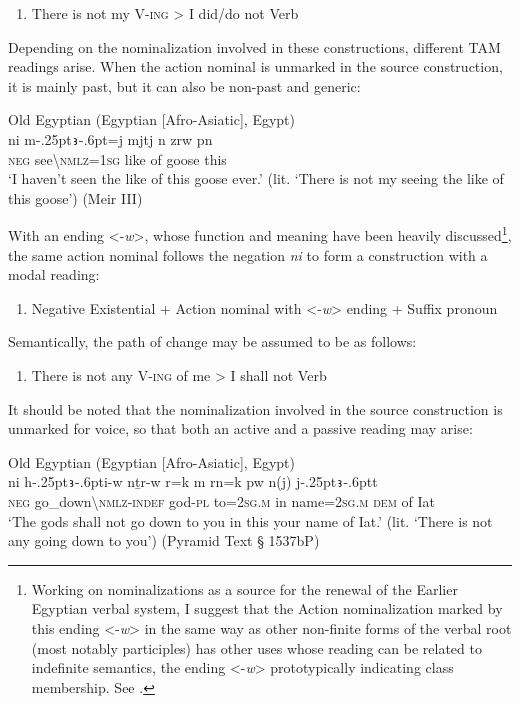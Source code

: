 \documentclass[output=paper]{langsci/langscibook}
\newcommand{\ꜥ}{ʿ}
\newcommand{\ꜣ}{\kern-.25pt\texttt{ꜣ}\kern-.6pt}
\begin{document}
\begin{enumerate}[label=(\roman*), resume] %
	\item There is not my V-\textsc{ing} > I did/do not Verb
\end{enumerate}

Depending on the nominalization involved in these constructions, different TAM readings arise. When the action nominal is unmarked in the source construction, it is mainly past, but it can also be non-past and generic: 

\ea Old Egyptian (Egyptian [Afro-Asiatic], Egypt) \label{ex:AE6}\\
	\gll ni m{\ꜣ}=j mjtj n zrw pn\\
	\textsc{neg} see\textbackslash\textsc{nmlz=1sg} like of goose this\\
	\glt ‘I haven’t seen the like of this goose ever.’ (lit. ‘There is not my seeing the like of this goose’) (Meir III)
\z 

With an ending <-\textit{w}>, whose function and meaning have been heavily discussed\footnote{Working on nominalizations as a source for the renewal of the Earlier Egyptian verbal system, I suggest that the Action nominalization marked by this ending <-\textit{w}> in the same way as other non-finite forms of the verbal root (most notably participles) has other uses whose reading can be related to indefinite semantics, the ending <-\textit{w}> prototypically indicating class membership. See \citet{Oreal2017}.}, the same action nominal follows the negation \textit{ni} to form a construction with a modal reading:

\begin{enumerate}[label=(\roman*), resume] %
	\item Negative Existential + Action nominal with <-\textit{w}> ending + Suffix pronoun
\end{enumerate}

Semantically, the path of change may be assumed to be as follows: 

\begin{enumerate}[label=(\roman*), resume] %
	\item There is not any V-\textsc{ing} of me > I shall not Verb
\end{enumerate}

It should be noted that the nominalization involved in the source construction is unmarked for voice, so that both an active and a passive reading may arise:

\ea Old Egyptian (Egyptian [Afro-Asiatic], Egypt) \label{ex:AE9}\\
	\gll ni h{\ꜣ}i-w nṯr-w r=k m rn=k pw n(j) j{\ꜣ}t\\
	\textsc{neg} go\_down\textbackslash\textsc{nmlz-indef} god-\textsc{pl} to=\textsc{2sg.m} in name=\textsc{2sg.m} \textsc{dem} of Iat\\
		‘The gods shall not go down to you in this your name of Iat.’ (lit. ‘There is not any going down to you’) (Pyramid Text § 1537bP)
\z
\end{document}
